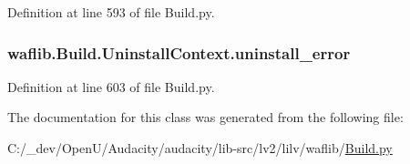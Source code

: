 Definition at line 593 of file Build.\+py.

\subsubsection[{\texorpdfstring{uninstall\+\_\+error}{uninstall_error}}]{\setlength{\rightskip}{0pt plus 5cm}waflib.\+Build.\+Uninstall\+Context.\+uninstall\+\_\+error}\hypertarget{classwaflib_1_1_build_1_1_uninstall_context_a5c820a859926188f982bc71a661522fd}{}\label{classwaflib_1_1_build_1_1_uninstall_context_a5c820a859926188f982bc71a661522fd}


Definition at line 603 of file Build.\+py.



The documentation for this class was generated from the following file\+:\begin{DoxyCompactItemize}
\item 
C\+:/\+\_\+dev/\+Open\+U/\+Audacity/audacity/lib-\/src/lv2/lilv/waflib/\hyperlink{lilv_2waflib_2_build_8py}{Build.\+py}\end{DoxyCompactItemize}
